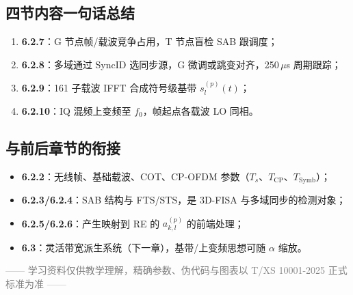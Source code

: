 \documentclass[11pt,a4paper]{ctexart}
\begin{document}
\subsection{四节内容一句话总结}

\begin{enumerate}
  \item \textbf{6.2.7}：G 节点帧/载波竞争占用，T 节点盲检 SAB 跟调度；
  \item \textbf{6.2.8}：多域通过 SyncID 选同步源，G 微调或跳变对齐，250\,$\mu$s 周期跟踪；
  \item \textbf{6.2.9}：161 子载波 IFFT 合成符号级基带 $s_l^{(p)}(t)$；
  \item \textbf{6.2.10}：IQ 混频上变频至 $f_0$，帧起点各载波 LO 同相。
\end{enumerate}

\subsection{与前后章节的衔接}

\begin{itemize}
  \item \textbf{6.2.2}：无线帧、基础载波、COT、CP-OFDM 参数（$T_s$、$T_{\mathrm{CP}}$、$T_{\mathrm{Symb}}$）；
  \item \textbf{6.2.3/6.2.4}：SAB 结构与 FTS/STS，是 3D-FISA 与多域同步的检测对象；
  \item \textbf{6.2.5/6.2.6}：产生映射到 RE 的 $a_{k,l}^{(p)}$ 的前端处理；
  \item \textbf{6.3}：灵活带宽派生系统（下一章），基带/上变频思想可随 $\alpha$ 缩放。
\end{itemize}

\begin{center}
\small\textcolor{gray}{—— 学习资料仅供教学理解，精确参数、伪代码与图表以 T/XS 10001-2025 正式标准为准 ——}
\end{center}
\end{document}
